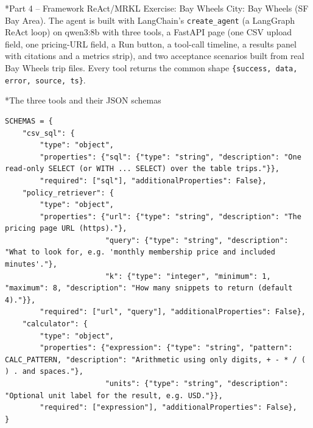 \documentclass[11pt]{article}
\makeatletter
\renewcommand\section{\@startsection{section}{1}{\z@}{-3.0ex \@plus -1ex \@minus -.2ex}{1.2ex \@plus.2ex}{\normalfont\fontsize{14}{17}\selectfont\bfseries}}
\renewcommand\subsection{\@startsection{subsection}{2}{\z@}{-2.2ex \@plus -1ex \@minus -.2ex}{0.8ex \@plus.2ex}{\normalfont\fontsize{12}{14.5}\selectfont\bfseries}}
\makeatother
\begin{document}
\section*{Part 4 -- Framework ReAct/MRKL Exercise: Bay Wheels}
City: Bay Wheels (SF Bay Area). The agent is built with LangChain's \texttt{create\_\allowbreak{}agent} (a LangGraph ReAct loop) on qwen3:8b with three tools, a FastAPI page (one CSV upload field, one pricing-URL field, a Run button, a tool-call timeline, a results panel with citations and a metrics strip), and two acceptance scenarios built from real Bay Wheels trip files. Every tool returns the common shape \texttt{\{success, data, error, source, ts\}}.

\subsection*{The three tools and their JSON schemas}
\begingroup\lstset{basicstyle=\ttfamily\tiny}
\begin{lstlisting}
SCHEMAS = {
    "csv_sql": {
        "type": "object",
        "properties": {"sql": {"type": "string", "description": "One read-only SELECT (or WITH ... SELECT) over the table trips."}},
        "required": ["sql"], "additionalProperties": False},
    "policy_retriever": {
        "type": "object",
        "properties": {"url": {"type": "string", "description": "The pricing page URL (https)."},
                       "query": {"type": "string", "description": "What to look for, e.g. 'monthly membership price and included minutes'."},
                       "k": {"type": "integer", "minimum": 1, "maximum": 8, "description": "How many snippets to return (default 4)."}},
        "required": ["url", "query"], "additionalProperties": False},
    "calculator": {
        "type": "object",
        "properties": {"expression": {"type": "string", "pattern": CALC_PATTERN, "description": "Arithmetic using only digits, + - * / ( ) . and spaces."},
                       "units": {"type": "string", "description": "Optional unit label for the result, e.g. USD."}},
        "required": ["expression"], "additionalProperties": False},
}
\end{lstlisting}
\endgroup
\begingroup\lstset{basicstyle=\ttfamily\tiny}
\end{document}
